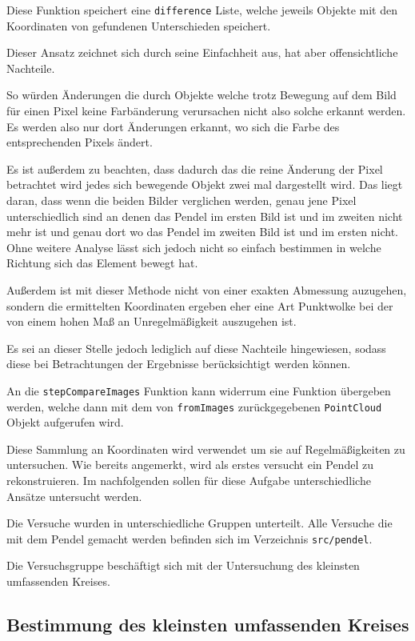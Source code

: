 Diese Funktion speichert eine \lstinline{difference} Liste, welche jeweils Objekte mit den Koordinaten von gefundenen Unterschieden speichert.

Dieser Ansatz zeichnet sich durch seine Einfachheit aus, hat aber offensichtliche Nachteile.

So würden Änderungen die durch Objekte welche trotz Bewegung auf dem Bild für einen Pixel keine Farbänderung verursachen nicht also solche erkannt werden.
Es werden also nur dort Änderungen erkannt, wo sich die Farbe des entsprechenden Pixels ändert.

Es ist außerdem zu beachten, dass dadurch das die reine Änderung der Pixel betrachtet wird jedes sich bewegende Objekt zwei mal dargestellt wird.
Das liegt daran, dass wenn die beiden Bilder verglichen werden, genau jene Pixel unterschiedlich sind an denen das Pendel im ersten Bild ist und im zweiten nicht mehr ist und genau dort wo das Pendel im zweiten Bild ist und im ersten nicht.
Ohne weitere Analyse lässt sich jedoch nicht so einfach bestimmen in welche Richtung sich das Element bewegt hat.

Außerdem ist mit dieser Methode nicht von einer exakten Abmessung auzugehen, sondern die ermittelten Koordinaten ergeben eher eine Art Punktwolke bei der von einem hohen Maß an Unregelmäßigkeit auszugehen ist.

Es sei an dieser Stelle jedoch lediglich auf diese Nachteile hingewiesen, sodass diese bei Betrachtungen der Ergebnisse berücksichtigt werden können.

An die \lstinline{stepCompareImages} Funktion kann widerrum eine Funktion übergeben werden, welche dann mit dem von \lstinline{fromImages} zurückgegebenen \lstinline{PointCloud} Objekt aufgerufen wird.

Diese Sammlung an Koordinaten wird verwendet um sie auf Regelmäßigkeiten zu untersuchen.
Wie bereits angemerkt, wird als erstes versucht ein Pendel zu rekonstruieren.
Im nachfolgenden sollen für diese Aufgabe unterschiedliche Ansätze untersucht werden.

Die Versuche wurden in unterschiedliche Gruppen unterteilt.
Alle Versuche die mit dem Pendel gemacht werden befinden sich im Verzeichnis \lstinline{src/pendel}.

Die Versuchsgruppe  beschäftigt sich mit der Untersuchung des kleinsten umfassenden Kreises. %

\subsection{Bestimmung des kleinsten umfassenden Kreises}

